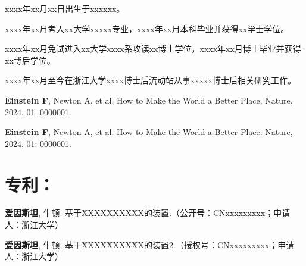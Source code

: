 \begin{resume}

  xxxx年xx月xx日出生于xxxxxx。
  
  xxxx年xx月考入xx大学xxxxx专业，xxxx年xx月本科毕业并获得xx学士学位。

  xxxx年xx月免试进入xx大学xxxx系攻读xx博士学位，xxxx年xx月博士毕业并获得xx博后学位。

  xxxx年xx月至今在浙江大学xxxx博士后流动站从事xxxxx博士后相关研究工作。

\end{resume}


\begin{achivementsdoc}  %

\begin{achievements}[start=1]

    \item \textbf{Einstein F}, Newton A, et al. How to Make the World a Better Place. Nature, 2024, 01: 0000001.

\end{achievements}

\end{achivementsdoc}

\begin{achivementspostdoc} %

\begin{achievements}[start=1]
    
    \item \textbf{Einstein F}, Newton A, et al. How to Make the World a Better Place. Nature, 2024, 01: 0000001.

\end{achievements}

\section*{专利：} 
\begin{achievements}[start=1]
    \item \textbf{爱因斯坦}, 牛顿. 基于XXXXXXXXXX的装置.（公开号：CNxxxxxxxxx；申请人：浙江大学）
    \item \textbf{爱因斯坦}, 牛顿. 基于XXXXXXXXXX的装置2.（授权号：CNxxxxxxxxx；申请人：浙江大学）
\end{achievements}

\end{achivementspostdoc}

\begin{attachedpapers}

\begin{figure*}[htbp]  
\end{figure*}

\end{attachedpapers}
